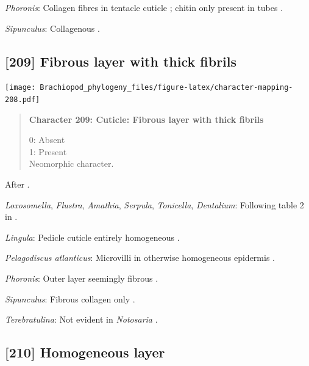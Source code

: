 \documentclass[openany]{book}
\begin{document}
\hypertarget{Phoronis-coding-208}{}
\emph{Phoronis}: Collagen fibres in tentacle cuticle
\citep{Bartolomaeus2001U}; chitin only present in tubes
\citep{Jeuniaux1971}.

\hypertarget{Sipunculus-coding-208}{}
\emph{Sipunculus}: Collagenous \citep{Goffinet1978}.

\subsection*{{[}209{]} Fibrous layer with thick
fibrils}\label{fibrous-layer-with-thick-fibrils}

\texttt{[image: Brachiopod\_phylogeny\_files/figure-latex/character-mapping-208.pdf]}

\begin{quote}
\textbf{Character 209: Cuticle: Fibrous layer with thick fibrils}

0: Absent\\
1: Present\\
Neomorphic character.
\end{quote}

After \citet{Borisanova2015}.

\hypertarget{Amathia-coding-209}{}
\emph{Loxosomella}, \emph{Flustra}, \emph{Amathia}, \emph{Serpula},
\emph{Tonicella}, \emph{Dentalium}: Following table 2 in
\citet{Borisanova2015}.

\hypertarget{Lingula-coding-209}{}
\emph{Lingula}: Pedicle cuticle entirely homogeneous
\citep{Williams1997Introduction}.

\hypertarget{Pelagodiscus_atlanticus-coding-209}{}
\emph{Pelagodiscus atlanticus}: Microvilli in otherwise homogeneous
epidermis \citep{Williams1997Introduction}.

\hypertarget{Phoronis-coding-209}{}
\emph{Phoronis}: Outer layer seemingly fibrous \citep{BereiterHahn1984}.

\hypertarget{Sipunculus-coding-209}{}
\emph{Sipunculus}: Fibrous collagen only \citep{BereiterHahn1984}.

\hypertarget{Terebratulina-coding-209}{}
\emph{Terebratulina}: Not evident in \emph{Notosaria}
\citep{BereiterHahn1984, Williams1997Introduction}.

\subsection*{{[}210{]} Homogeneous layer}\label{homogeneous-layer}
\end{document}
